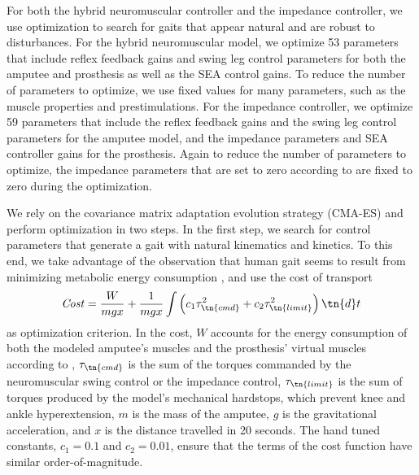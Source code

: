 For both the hybrid neuromuscular controller and the impedance controller, we
use optimization to search for gaits that appear natural and are robust to
disturbances. For the hybrid neuromuscular model, we optimize 53 parameters that
include reflex feedback gains and swing leg control parameters for both the
amputee and prosthesis as well as the SEA control gains. To reduce the number of
parameters to optimize, we use fixed values for many parameters, such as the
muscle properties and prestimulations. For the impedance controller, we optimize
59 parameters that include the reflex feedback gains and the swing leg control
parameters for the amputee model, and the impedance parameters and SEA
controller gains for the prosthesis. Again to reduce the number of parameters to
optimize, the impedance parameters that are set to zero according to
\citet{sup2008design} are fixed to zero during the optimization. 

We rely on the covariance matrix adaptation evolution strategy (CMA-ES)
\citep{hansen2006cma} and perform optimization in two steps. In the first step,
we search for control parameters that generate a gait with natural kinematics
and kinetics. To this end, we take advantage of the observation that human gait
seems to result from minimizing metabolic energy consumption
\citep{mcneill2002energetics}, and use the cost of transport 
\begin{align}
    \mathit{Cost} = \frac{W}{mgx} + \frac{1}{mgx} \int \left( 
        c_1\tau_\tn{cmd}^2  + c_2 \tau_\tn{limit}^2 \right) \tn{d}t
    \label{eq:costfuncenergy}
\end{align}
as optimization criterion. In the cost, $W$ accounts for the energy consumption
of both the modeled amputee's muscles and the prosthesis' virtual muscles
according to \citet{umberger2003model}, $\tau_\tn{cmd}$ is the sum of the
torques commanded by the neuromuscular swing control or the impedance control,
$\tau_\tn{limit}$ is the sum of torques produced by the model's mechanical
hardstops, which prevent knee and ankle hyperextension, $m$ is the mass of the
amputee, $g$ is the gravitational acceleration, and $x$ is the distance
travelled in 20 seconds. The hand tuned constants, $c_1 = 0.1$ and $c_2 = 0.01$,
ensure that the terms of the cost function have similar order-of-magnitude. 

